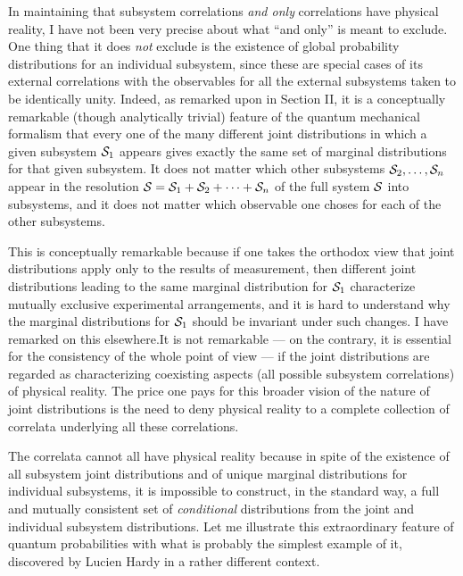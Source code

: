 In maintaining that subsystem correlations {\it and only} correlations
have physical reality, I have not been very precise about what ``and
only'' is meant to exclude.  One thing that it does {\it not\/}
exclude is the existence of global probability distributions for an
individual subsystem, since these are special cases of its external
correlations with the observables for all the external subsystems
taken to be identically unity.  Indeed, as remarked upon in Section
II, it is a conceptually remarkable (though analytically trivial)
feature of the quantum mechanical formalism that every one of the many
different joint distributions in which a given subsystem ${\cal S}_1$
appears gives exactly the same set of marginal distributions for that
given subsystem.  It does not matter which other subsystems
${\cal S}_2,\ldots,{\cal S}_n$ appear in the resolution ${\cal S} =
{\cal S}_1 + {\cal S}_2 +\cdots+ {\cal S}_n$ of the full system ${\cal S}$ into subsystems,
and it does not matter which observable one choses for each of the
other subsystems.  

This is conceptually remarkable because if one takes the orthodox view
that joint distributions apply only to the results of measurement,
then different joint distributions leading to the same marginal
distribution for ${\cal S}_1$ characterize mutually exclusive experimental
arrangements, and it is hard to understand why the marginal
distributions for ${\cal S}_1$ should be invariant under such changes.  I
have remarked on this elsewhere.\fn It is not remarkable --- on
the contrary, it is essential for the consistency of the whole point
of view --- if the joint distributions are regarded as characterizing
coexisting aspects (all possible subsystem correlations) of physical
reality.  The price one pays for this broader vision of the nature of
joint distributions is the need to deny physical reality to a
complete collection of correlata underlying all these correlations.

The correlata cannot all have physical reality because in spite of the
existence of all subsystem joint distributions and of unique marginal
distributions for individual subsystems, it is impossible to
construct, in the standard way, a full and mutually consistent set of
{\it conditional\/} distributions from the joint and individual
subsystem distributions.  Let me illustrate this extraordinary feature
of quantum probabilities with what is probably the simplest example of
it, discovered by Lucien Hardy in a rather different
context.\fn

